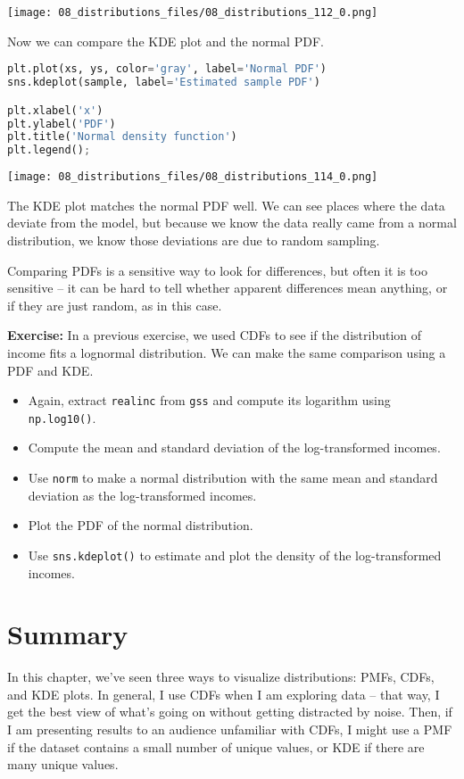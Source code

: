 \begin{center}
\texttt{[image: 08\_distributions\_files/08\_distributions\_112\_0.png]}
\end{center}

Now we can compare the KDE plot and the normal PDF.

\begin{lstlisting}[language=Python,style=source]
plt.plot(xs, ys, color='gray', label='Normal PDF')
sns.kdeplot(sample, label='Estimated sample PDF')

plt.xlabel('x')
plt.ylabel('PDF')
plt.title('Normal density function')
plt.legend();
\end{lstlisting}

\begin{center}
\texttt{[image: 08\_distributions\_files/08\_distributions\_114\_0.png]}
\end{center}

The KDE plot matches the normal PDF well. We can see places where the
data deviate from the model, but because we know the data really came
from a normal distribution, we know those deviations are due to random
sampling.

Comparing PDFs is a sensitive way to look for differences, but often it
is too sensitive -- it can be hard to tell whether apparent differences
mean anything, or if they are just random, as in this case.

\textbf{Exercise:} In a previous exercise, we used CDFs to see if the
distribution of income fits a lognormal distribution. We can make the
same comparison using a PDF and KDE.

\begin{itemize}
\item
  Again, extract \passthrough{\lstinline!realinc!} from
  \passthrough{\lstinline!gss!} and compute its logarithm using
  \passthrough{\lstinline!np.log10()!}.
\item
  Compute the mean and standard deviation of the log-transformed
  incomes.
\item
  Use \passthrough{\lstinline!norm!} to make a normal distribution with
  the same mean and standard deviation as the log-transformed incomes.
\item
  Plot the PDF of the normal distribution.
\item
  Use \passthrough{\lstinline!sns.kdeplot()!} to estimate and plot the
  density of the log-transformed incomes.
\end{itemize}

\section{Summary}\label{summary}

In this chapter, we've seen three ways to visualize distributions: PMFs,
CDFs, and KDE plots. In general, I use CDFs when I am exploring data --
that way, I get the best view of what's going on without getting
distracted by noise. Then, if I am presenting results to an audience
unfamiliar with CDFs, I might use a PMF if the dataset contains a small
number of unique values, or KDE if there are many unique values.
